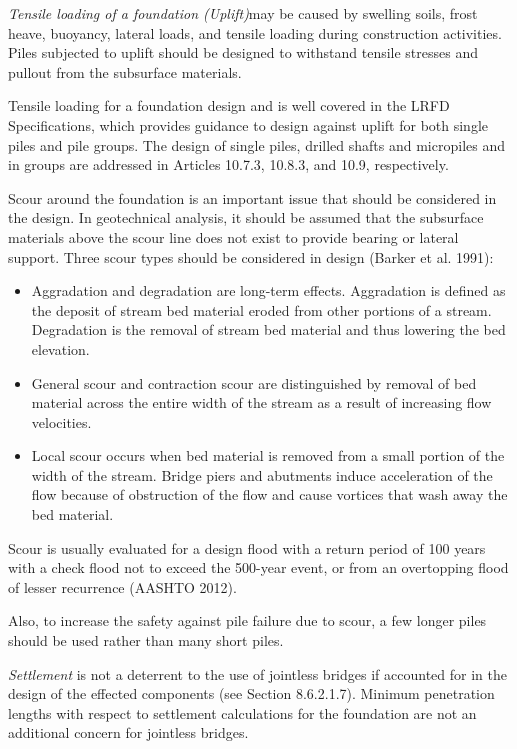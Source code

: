 \emph{Tensile loading of a foundation (Uplift)}may be caused by swelling soils, frost heave, buoyancy, lateral loads,
and tensile loading during construction activities. Piles subjected to uplift should be designed to withstand tensile
stresses and pullout from the subsurface materials.

Tensile loading for a foundation design and is well covered in the LRFD Specifications, which provides guidance
to design against uplift for both single piles and pile groups. The design of single piles, drilled shafts and micropiles
and in groups are addressed in Articles 10.7.3, 10.8.3, and 10.9, respectively.

Scour around the foundation is an important issue that should be considered in the design. In geotechnical
analysis, it should be assumed that the subsurface materials above the scour line does not exist to provide bearing or
lateral support. Three scour types should be considered in design (Barker et al. 1991):
\begin{itemize}
  \item Aggradation and degradation are long-term effects. Aggradation is defined as the deposit of stream bed
  material eroded from other portions of a stream. Degradation is the removal of stream bed material and thus
  lowering the bed elevation.
  \item General scour and contraction scour are distinguished by removal of bed material across the entire width of
  the stream as a result of increasing flow velocities.
  \item Local scour occurs when bed material is removed from a small portion of the width of the stream. Bridge
  piers and abutments induce acceleration of the flow because of obstruction of the flow and cause vortices that
  wash away the bed material.
\end{itemize}

Scour is usually evaluated for a design flood with a return period of 100 years with a check flood not to exceed
the 500-year event, or from an overtopping flood of lesser recurrence (AASHTO 2012).

Also, to increase the safety against pile failure due to scour, a few longer piles should be used rather than many
short piles.

\emph{Settlement} is not a deterrent to the use of jointless bridges if accounted for in the design of the effected
components (see Section 8.6.2.1.7). Minimum penetration lengths with respect to settlement calculations for the
foundation are not an additional concern for jointless bridges.

